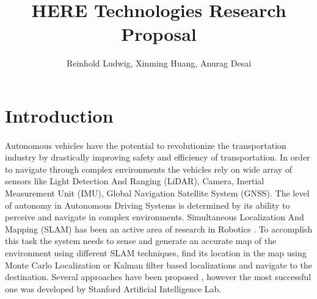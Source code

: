 \documentclass{article}
\title{HERE Technologies Research Proposal}
\author{Reinhold Ludwig, Xinming Huang, Anurag Desai}
\begin{document}
	\maketitle
	\newpage
	

	
	\section{Introduction}
		\paragraph{}
		Autonomous vehicles have the potential to revolutionize the transportation industry by drastically improving safety and efficiency of transportation. In order to navigate through complex environments the vehicles rely on wide array of sensors like Light Detection And Ranging (LiDAR), Camera, Inertial Measurement Unit (IMU), Global Navigation Satellite System (GNSS). The level of autonomy in Autonomous Driving Systems is determined by its ability to perceive and navigate in complex environments. Simultaneous Localization And Mapping (SLAM) has been an active area of research in Robotics
		\cite{durrant-whyte_simultaneous_nodate}
		\cite{bailey_simultaneous_2006}.
		To accomplish this task the system needs to sense and generate an accurate map of the environment using different SLAM techniques, find its location in the map using Monte Carlo Localization
		\cite{thrun_robust_2001}
		or Kalman filter based localizations 
		and navigate to the destination. Several approaches have been proposed 
		\cite{durrant-whyte_simultaneous_nodate}
		\cite{thrun_graph_2006},
		however the most successful one
		\cite{levinson_map-based_2007}
		was developed by Stanford Artificial Intelligence Lab. 
		
\end{document}
